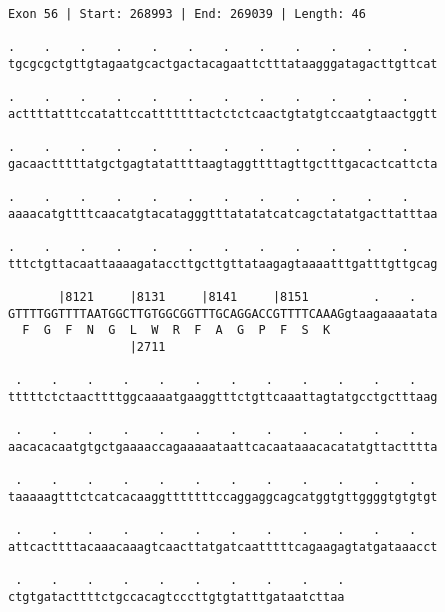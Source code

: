 \documentclass{article}
\begin{document}
\begin{Verbatim}[fontfamily=courier]
Exon 56 | Start: 268993 | End: 269039 | Length: 46

.    .    .    .    .    .    .    .    .    .    .    .    
tgcgcgctgttgtagaatgcactgactacagaattctttataagggatagacttgttcat

.    .    .    .    .    .    .    .    .    .    .    .    
acttttatttccatattccatttttttactctctcaactgtatgtccaatgtaactggtt

.    .    .    .    .    .    .    .    .    .    .    .    
gacaactttttatgctgagtatattttaagtaggttttagttgctttgacactcattcta

.    .    .    .    .    .    .    .    .    .    .    .    
aaaacatgttttcaacatgtacatagggtttatatatcatcagctatatgacttatttaa

.    .    .    .    .    .    .    .    .    .    .    .    
tttctgttacaattaaaagataccttgcttgttataagagtaaaatttgatttgttgcag

       |8121     |8131     |8141     |8151         .    .   
GTTTTGGTTTTAATGGCTTGTGGCGGTTTGCAGGACCGTTTTCAAAGgtaagaaaatata
  F  G  F  N  G  L  W  R  F  A  G  P  F  S  K               
                 |2711                                      

 .    .    .    .    .    .    .    .    .    .    .    .   
tttttctctaacttttggcaaaatgaaggtttctgttcaaattagtatgcctgctttaag

 .    .    .    .    .    .    .    .    .    .    .    .   
aacacacaatgtgctgaaaaccagaaaaataattcacaataaacacatatgttactttta

 .    .    .    .    .    .    .    .    .    .    .    .   
taaaaagtttctcatcacaaggtttttttccaggaggcagcatggtgttggggtgtgtgt

 .    .    .    .    .    .    .    .    .    .    .    .   
attcacttttacaaacaaagtcaacttatgatcaatttttcagaagagtatgataaacct

 .    .    .    .    .    .    .    .    .    .
ctgtgatacttttctgccacagtcccttgtgtatttgataatcttaa
\end{Verbatim}
\newpage
\end{document}

